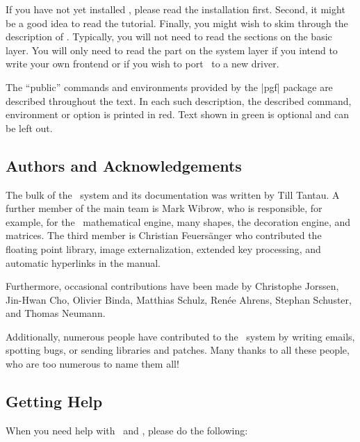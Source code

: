 If you have not yet installed \pgfname, please read the installation
first. Second, it might be a good idea to read the tutorial. Finally,
you might wish to skim through the description of \tikzname. Typically,
you will not need to read the sections on the basic layer. You will
only need to read the part on the system layer if you intend to write
your own frontend or if you wish to port \pgfname\ to a new driver.

The ``public'' commands and environments provided by the |pgf| package
are described throughout the text. In each such description, the
described command, environment or option is printed in red. Text shown
in green is optional and can be left out.


\subsection{Authors and Acknowledgements}
\label{section-authors}

The bulk of the \pgfname\ system and its documentation was written by
Till Tantau. A further member of the main team is Mark Wibrow, who
is responsible, for example, for the \pgfname\ mathematical engine,
many shapes, the decoration engine, and matrices. The third member is
Christian Feuers\"anger who contributed the floating point library,
image externalization, extended key processing, and automatic hyperlinks
in the manual.

Furthermore, occasional contributions have been made by Christophe
Jorssen, Jin-Hwan Cho, Olivier Binda, Matthias Schulz, Ren\'ee Ahrens,
Stephan Schuster, and Thomas Neumann.

Additionally, numerous people have contributed to the \pgfname\ system
by writing emails, spotting bugs, or sending libraries and patches.
Many thanks to all these people, who are too numerous to name them
all!



\subsection{Getting Help}

When you need help with \pgfname\ and \tikzname, please do the
following:


